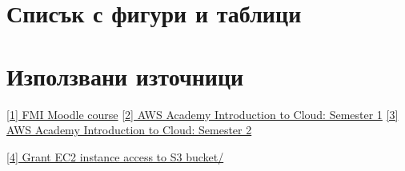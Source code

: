 \documentclass[12pt]{article}
\begin{document}
\section{Списък с фигури и таблици}

\listoffigures

\section{Използвани източници}

\noindent\href{https://learn.fmi.uni-sofia.bg/course/view.php?id=8205}{[1] FMI Moodle course}
\newline
\noindent\href{https://awsacademy.instructure.com/courses/15596}{[2] AWS Academy Introduction to Cloud: Semester 1}
\newline
\noindent\href{https://awsacademy.instructure.com/courses/15407}{[3] AWS Academy Introduction to Cloud: Semester 2}

\noindent\href{https://aws.amazon.com/premiumsupport/knowledge-center/ec2-instance-access-s3-bucket/}{[4] Grant EC2 instance access to S3 bucket/}
 
\medskip



\bigskip
\end{document}
